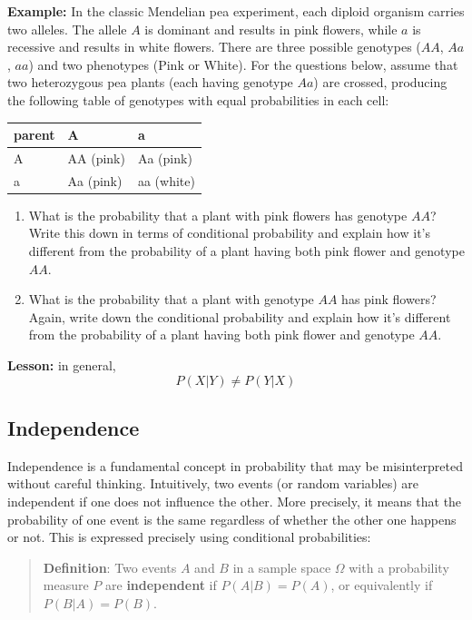 \documentclass[
  letterpaper,
  DIV=11,
  numbers=noendperiod]{scrreprt}
\begin{document}
\textbf{Example:} In the classic Mendelian pea experiment, each diploid
organism carries two alleles. The allele \(A\) is dominant and results
in pink flowers, while \(a\) is recessive and results in white flowers.
There are three possible genotypes (\(AA\), \(Aa\), \(aa\)) and two
phenotypes (Pink or White). For the questions below, assume that two
heterozygous pea plants (each having genotype \(Aa\)) are crossed,
producing the following table of genotypes with equal probabilities in
each cell:

\begin{longtable}[]{@{}lll@{}}
\toprule\noalign{}
parent & A & a \\
\midrule\noalign{}
\endhead
\bottomrule\noalign{}
\endlastfoot
A & AA (pink) & Aa (pink) \\
a & Aa (pink) & aa (white) \\
\end{longtable}

\begin{enumerate}
\def\labelenumi{\arabic{enumi}.}
\item
  What is the probability that a plant with pink flowers has genotype
  \(AA\)? Write this down in terms of conditional probability and
  explain how it's different from the probability of a plant having both
  pink flower and genotype \(AA\).
\item
  What is the probability that a plant with genotype \(AA\) has pink
  flowers? Again, write down the conditional probability and explain how
  it's different from the probability of a plant having both pink flower
  and genotype \(AA\).
\end{enumerate}

\textbf{Lesson:} in general, \[P(X \vert  Y ) \neq P(Y \vert  X)\]

\subsection{Independence}\label{independence-1}

Independence is a fundamental concept in probability that may be
misinterpreted without careful thinking. Intuitively, two events (or
random variables) are independent if one does not influence the other.
More precisely, it means that the probability of one event is the same
regardless of whether the other one happens or not. This is expressed
precisely using conditional probabilities:

\begin{quote}
\textbf{Definition}: Two events \(A\) and \(B\) in a sample space
\(\Omega\) with a probability measure \(P\) are \textbf{independent} if
\(P(A\vert B) = P(A)\), or equivalently if \(P(B\vert A) = P(B)\).
\end{quote}
\end{document}
